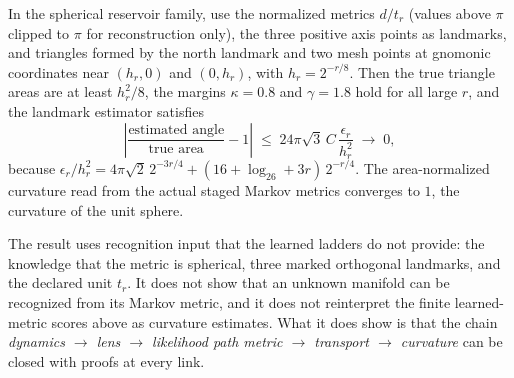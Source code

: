 \begin{theorem}
\label{thm:markov-curvature}
In the spherical reservoir family, use the normalized metrics $d/t_r$ (values above $\pi$ clipped to $\pi$ for reconstruction only), the three positive axis points as landmarks, and triangles formed by the north landmark and two mesh points at gnomonic coordinates near $(h_r,0)$ and $(0,h_r)$, with $h_r=2^{-r/8}$.
Then the true triangle areas are at least $h_r^2/8$, the margins $\kappa=0.8$ and $\gamma=1.8$ hold for all large $r$, and the landmark estimator satisfies
\begin{equation}
\left|\frac{\text{estimated angle}}{\text{true area}}-1\right|\;\le\;24\pi\sqrt3\,C\,\frac{\epsilon_r}{h_r^2}\;\longrightarrow\;0,
\end{equation}
because $\epsilon_r/h_r^2=4\pi\sqrt2\,2^{-3r/4}+(16+\log_26+3r)\,2^{-r/4}$.
The area-normalized curvature read from the actual staged Markov metrics converges to $1$, the curvature of the unit sphere.
\end{theorem}


The result uses recognition input that the learned ladders do not provide: the knowledge that the metric is spherical, three marked orthogonal landmarks, and the declared unit $t_r$.
It does not show that an unknown manifold can be recognized from its Markov metric, and it does not reinterpret the finite learned-metric scores above as curvature estimates.
What it does show is that the chain \emph{dynamics $\to$ lens $\to$ likelihood path metric $\to$ transport $\to$ curvature} can be closed with proofs at every link.
